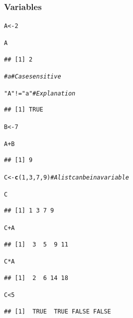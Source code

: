 \documentclass{beamer}\usepackage[]{graphicx}\usepackage[]{color}
\makeatletter
\newcommand{\hlnum}[1]{\textcolor[rgb]{0.686,0.059,0.569}{#1}}%
\newcommand{\hlstr}[1]{\textcolor[rgb]{0.192,0.494,0.8}{#1}}%
\newcommand{\hlcom}[1]{\textcolor[rgb]{0.678,0.584,0.686}{\textit{#1}}}%
\newcommand{\hlopt}[1]{\textcolor[rgb]{0,0,0}{#1}}%
\newcommand{\hlstd}[1]{\textcolor[rgb]{0.345,0.345,0.345}{#1}}%
\newcommand{\hlkwb}[1]{\textcolor[rgb]{0.69,0.353,0.396}{#1}}%
\newcommand{\hlkwd}[1]{\textcolor[rgb]{0.737,0.353,0.396}{\textbf{#1}}}%
\newenvironment{kframe}{%
 \def\at@end@of@kframe{}%
 \ifinner\ifhmode%
  \def\at@end@of@kframe{\end{minipage}}%
  \begin{minipage}{\columnwidth}%
 \fi\fi%
 \def\FrameCommand##1{\hskip\@totalleftmargin \hskip-\fboxsep
 \colorbox{shadecolor}{##1}\hskip-\fboxsep
     \hskip-\linewidth \hskip-\@totalleftmargin \hskip\columnwidth}%
 \MakeFramed {\advance\hsize-\width
   \@totalleftmargin\z@ \linewidth\hsize
   \@setminipage}}%
 {\par\unskip\endMakeFramed%
 \at@end@of@kframe}
\newenvironment{knitrout}{}{} %
\makeatother
\begin{document}
\begin{frame}
\frametitle{Variables}

\begin{knitrout}\scriptsize
{}\color{fgcolor}\begin{kframe}
\begin{alltt}
\hlstd{A} \hlkwb{<-} \hlnum{2}

\hlstd{A}
\end{alltt}
\begin{verbatim}
## [1] 2
\end{verbatim}
\begin{alltt}
\hlcom{# a # Case sensitive}

\hlstr{"A"} \hlopt{!=} \hlstr{"a"}  \hlcom{# Explanation}
\end{alltt}
\begin{verbatim}
## [1] TRUE
\end{verbatim}
\begin{alltt}
\hlstd{B} \hlkwb{<-} \hlnum{7}

\hlstd{A} \hlopt{+} \hlstd{B}
\end{alltt}
\begin{verbatim}
## [1] 9
\end{verbatim}
\end{kframe}
\end{knitrout}

\begin{knitrout}\scriptsize
{}\color{fgcolor}\begin{kframe}
\begin{alltt}
\hlstd{C} \hlkwb{<-} \hlkwd{c}\hlstd{(}\hlnum{1}\hlstd{,} \hlnum{3}\hlstd{,} \hlnum{7}\hlstd{,} \hlnum{9}\hlstd{)}  \hlcom{# A list can be in a variable}

\hlstd{C}
\end{alltt}
\begin{verbatim}
## [1] 1 3 7 9
\end{verbatim}
\begin{alltt}
\hlstd{C} \hlopt{+} \hlstd{A}
\end{alltt}
\begin{verbatim}
## [1]  3  5  9 11
\end{verbatim}
\begin{alltt}
\hlstd{C} \hlopt{*} \hlstd{A}
\end{alltt}
\begin{verbatim}
## [1]  2  6 14 18
\end{verbatim}
\begin{alltt}
\hlstd{C} \hlopt{<} \hlnum{5}
\end{alltt}
\begin{verbatim}
## [1]  TRUE  TRUE FALSE FALSE
\end{verbatim}
\end{kframe}
\end{knitrout}

\end{frame}
\end{document}
